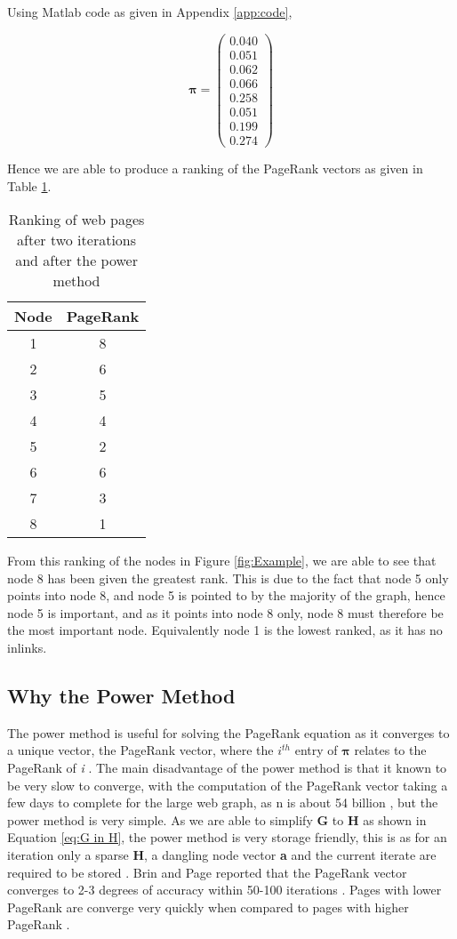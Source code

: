 \documentclass[11pt]{report}
\begin{document}
Using Matlab code as given in Appendix \ref{app:code}, 

\[\boldsymbol\pi = \left(
\begin{array}{c}
0.040 \\
0.051 \\
0.062 \\
0.066 \\
0.258 \\
0.051 \\
0.199 \\
0.274
\end{array}
\right)\]

Hence we are able to produce a ranking of the PageRank vectors as given in Table \ref{tble:PR}. 
\begin{table}[h] \caption{Ranking of web pages after two iterations and after the power method}
 \centering
 \begin{tabular} {c| c} 
 Node & PageRank \\ [0.5ex] 
 \hline
 1&8\\
 2&6\\
 3&5\\
 4&4\\
 5&2\\
 6&6\\
 7&3\\
 8&1\\
 \end{tabular}
 \label{tble:PR}
\end{table}

From this ranking of the nodes in Figure \ref{fig:Example}, we are able to see that node 8 has been given the greatest rank. This is due to the fact that node 5 only points into node 8, and node 5 is pointed to by the majority of the graph, hence node 5 is important, and as it points into node 8 only, node 8 must therefore be the most important node. Equivalently node 1 is the lowest ranked, as it has no inlinks.

\subsection{Why the Power Method}\label{sec:why power}

The power method is useful for solving the PageRank equation as it converges to a unique vector, the PageRank vector, where the $i^{th}$ entry of $\boldsymbol\pi$ relates to the PageRank of \textit{i} \cite{ipsen2005analysis}. The main disadvantage of the power method is that it known to be very slow to converge, with the computation of the PageRank vector taking a few days to complete for the large web graph, as n is about 54 billion \cite{bonato}, but the power method is very simple. As we are able to simplify \textbf{G} to \textbf{H} as shown in Equation \eqref{eq:G in H}, the power method is very storage friendly, this is as for an iteration only a sparse \textbf{H}, a dangling node vector \textbf{a} and the current iterate are required to be stored \cite{langville}. Brin and Page reported that the PageRank vector converges to 2-3 degrees of accuracy within 50-100 iterations \cite{austin}. Pages with lower PageRank are converge very quickly when compared to pages with higher PageRank \cite{thorson2004modeling}.
\end{document}
